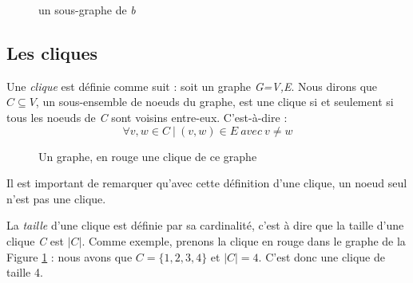 \documentclass[12pt,a4paper]{article}
\begin{document}
\begin{figure}
  \centering
  \caption{un sous-graphe de \textit{b}}
\end{figure}

\subsection{Les cliques}%
\label{subsec:cliques}

Une \textit{clique} est définie comme suit :
soit un graphe \emph{G=V,E}. Nous dirons que \(C \subseteq V\), un sous-ensemble de noeuds du graphe, est une clique si et seulement si tous les noeuds de \emph{C} sont voisins entre-eux.
C'est-à-dire :
\begin{equation}\label{clique}
\forall v, w \in C \ | \ (v, w)\in E \ avec\  v \neq w
\end{equation}

\begin{figure}[h]
  \centering
  \caption{Un graphe, en rouge une clique de ce graphe}
  \label{fig:x clique1}
\end{figure}

Il est important de remarquer qu'avec cette définition d'une clique, un noeud seul n'est pas une clique.

La \textit{taille} d'une clique est définie par sa cardinalité, c'est à dire que la taille d'une clique \emph{C} est \(|C|\). Comme exemple, prenons la clique en rouge dans le graphe de la Figure \ref{fig:x clique1} : nous avons que \(C = \{1,2,3,4\}\) et \(|C| = 4\). C'est donc une clique de taille 4.
\end{document}
